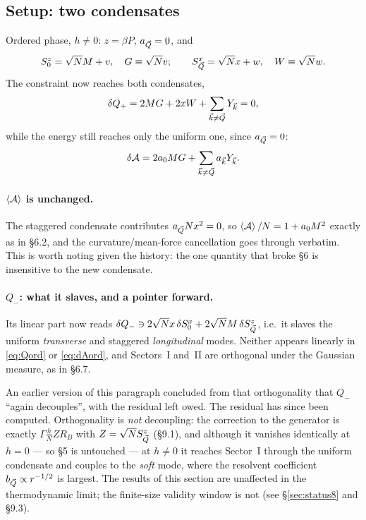 \subsection{Setup: two condensates}
Ordered phase, $h\neq0$: $z=\beta P$, $a_{\vec Q}=0$, and
\begin{equation}
  S^z_0=\sqrt NM+v,\quad G\equiv\sqrt N v;
  \qquad
  S^x_{\vec Q}=\sqrt Nx+w,\quad W\equiv\sqrt N w .
\end{equation}
The constraint now reaches both condensates,
\begin{equation}
  \delta Q_+=2MG+2xW+\sum_{\vec k\neq\vec Q}Y_{\vec k}=0 ,
  \label{eq:Qord}
\end{equation}
while the energy still reaches only the uniform one, since $a_{\vec Q}=0$:
\begin{equation}
  \delta\mathcal{A}=2a_0MG+\sum_{\vec k\neq\vec Q}a_{\vec k}Y_{\vec k} .
  \label{eq:dAord}
\end{equation}

\paragraph{$\left\langle \mathcal{A} \right\rangle$ is unchanged.} The staggered condensate contributes
$a_{\vec Q}Nx^{2}=0$, so $\left\langle \mathcal{A} \right\rangle/N=1+a_0M^{2}$ exactly as in \S6.2, and the
curvature/mean-force cancellation goes through verbatim. This is worth noting given the
history: the one quantity that broke \S6 is insensitive to the new condensate.

\paragraph{$Q_-$: what it slaves, and a pointer forward.} Its linear part now reads
$\delta Q_-\ni2\sqrt Nx\,\delta S^x_0+2\sqrt NM\,\delta S^z_{\vec Q}$, i.e.\ it slaves the
uniform \emph{transverse} and staggered \emph{longitudinal} modes. Neither appears linearly
in \eqref{eq:Qord} or \eqref{eq:dAord}, and Sectors~I and~II are orthogonal under the
Gaussian measure, as in \S6.7.

 An earlier version of this paragraph concluded from that
orthogonality that $Q_-$ ``again decouples'', with the residual left owed. The residual has
since been computed. Orthogonality is \emph{not} decoupling: the correction to the generator
is exactly $\Gamma\frac hN Z R_B$ with $Z=\sqrt N S^z_{\vec Q}$ (\S9.1), and although it
vanishes identically at $h=0$ --- so \S5 is untouched --- at $h\neq0$ it reaches Sector~I
through the uniform condensate and couples to the \emph{soft} mode, where the resolvent
coefficient $b_{\vec Q}\propto r^{-1/2}$ is largest. The results of this section are unaffected
in the thermodynamic limit; the finite-size validity window is not (see \S\ref{sec:status8}
and \S9.3).

